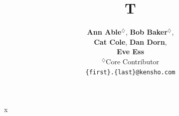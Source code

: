 \documentclass{article}
\begin{document}
\title{T}
\author{
 \textbf{Ann Able}$^{\diamondsuit}$\textrm{,}
 \textbf{Bob Baker}$^{\diamondsuit}$\textrm{,}
 \\
 \textbf{Cat Cole},
 \textbf{Dan Dorn},
 \\
 \textbf{Eve Ess}\\
$^{\diamondsuit}$Core Contributor\\
\texttt{\{first\}.\{last\}@kensho.com}
}
\maketitle
x
\end{document}
